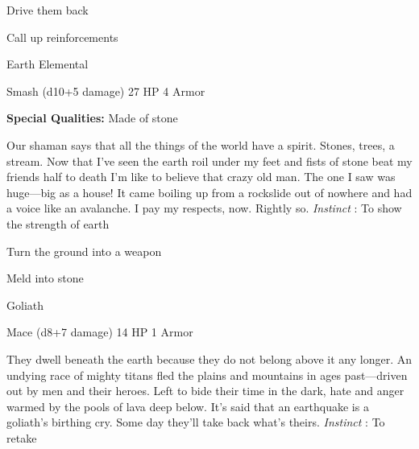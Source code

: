 \startitemize[1,packed]
         
\item Drive them back

         
\item Call up reinforcements

       
\stopitemize
       
\startMonsterName
Earth Elemental	 
\stopMonsterName
       

Smash (d10+5 damage)	27 HP	4 Armor

       


       
\startMonsterQualities
         {\bf Special Qualities:}  Made of stone
\stopMonsterQualities
       
\startMonsterDescription
Our shaman says that all the things of the world have a spirit. Stones, trees, a stream. Now that I’ve seen the earth roil under my feet and fists of stone beat my friends half to death I’m like to believe that crazy old man. The one I saw was huge—big as a house! It came boiling up from a rockslide out of nowhere and had a voice like an avalanche. I pay my respects, now. Rightly so. {\em Instinct} : To show the strength of earth
\stopMonsterDescription
       
\startitemize[1,packed]
         
\item Turn the ground into a weapon

         
\item Meld into stone

       
\stopitemize
       
\startMonsterName
Goliath	 
\stopMonsterName
       

Mace (d8+7 damage)	14 HP	1 Armor

       


       
\startMonsterDescription
They dwell beneath the earth because they do not belong above it any longer. An undying race of mighty titans fled the plains and mountains in ages past—driven out by men and their heroes. Left to bide their time in the dark, hate and anger warmed by the pools of lava deep below. It’s said that an earthquake is a goliath’s birthing cry. Some day they’ll take back what’s theirs. {\em Instinct} : To retake
\stopMonsterDescription
       
